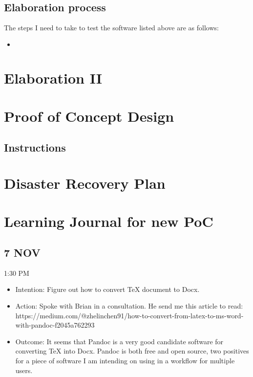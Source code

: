\documentclass{article}
\begin{document}
\subsection{Elaboration process}

The steps I need to take to test the software listed above are as follows:

\begin{itemize}
    \item 
\end{itemize}

\section{Elaboration II}

\section{Proof of Concept Design}

\subsection{Instructions}

\section{Disaster Recovery Plan}

\section{Learning Journal for new PoC}

\subsection{7 NOV}

1:30 PM
\begin{itemize}
    \item Intention: Figure out how to convert TeX document to Docx.
    \item Action: Spoke with Brian in a consultation. He send me this article to read: https://medium.com/@zhelin\-chen91/how-to-convert-from-latex-to-ms-word-with-pandoc-f2045a762293
    \item Outcome: It seems that Pandoc is a very good candidate software for converting TeX into Docx. Pandoc is both free and open source, two positives for a piece of software I am intending on using in a workflow for multiple users.
\end{itemize}
\end{document}
